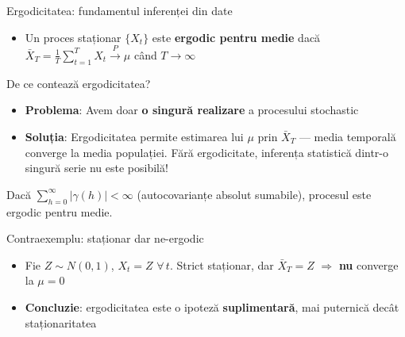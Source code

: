 \documentclass[9pt, aspectratio=169, t]{beamer}
\begin{document}
\begin{frame}{Ergodicitatea: fundamentul inferenței din date}
    \footnotesize
    \vspace{-1mm}
    \begin{defn}
        \begin{itemize}\setlength{\itemsep}{0pt}
            \item Un proces staționar $\{X_t\}$ este \textbf{ergodic pentru medie} dacă
            $\bar{X}_T = \frac{1}{T}\sum_{t=1}^{T} X_t \xrightarrow{P} \mu$ când $T \to \infty$
        \end{itemize}
    \end{defn}
    \vspace{-2mm}
    \begin{alertblock}{De ce contează ergodicitatea?}
        \begin{itemize}\setlength{\itemsep}{0pt}
            \item \textbf{Problema}: Avem doar \textbf{o singură realizare} a procesului stochastic
            \item \textbf{Soluția}: Ergodicitatea permite estimarea lui $\mu$ prin $\bar{X}_T$ --- media temporală converge la media populației. Fără ergodicitate, inferența statistică dintr-o singură serie nu este posibilă!
        \end{itemize}
    \end{alertblock}
    \vspace{-2mm}
    \begin{thm}
        Dacă $\sum_{h=0}^{\infty} |\gamma(h)| < \infty$ (autocovarianțe absolut sumabile), procesul este ergodic pentru medie.
    \end{thm}
    \vspace{-2mm}
    {\scriptsize
    \begin{alertblock}{Contraexemplu: staționar dar ne-ergodic}
        \begin{itemize}\setlength{\itemsep}{0pt}
            \item Fie $Z \sim N(0,1)$, $X_t = Z$ $\forall\, t$. Strict staționar, dar $\bar{X}_T = Z$ $\Rightarrow$ \textbf{nu} converge la $\mu = 0$
            \item \textbf{Concluzie}: ergodicitatea este o ipoteză \textbf{suplimentară}, mai puternică decât staționaritatea
        \end{itemize}
    \end{alertblock}
    }
\end{frame}
\end{document}
